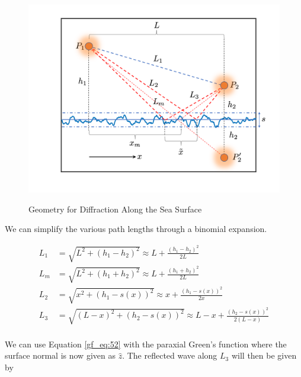 \begin{figure}[ht]
  \begin{center}
\includegraphics[width=5in]{../media/analysis/multipath_layout.png}
  \end{center}
  \renewcommand{\baselinestretch}{1} \small\normalsize
  \begin{quote}
    \caption[Geometry for Diffraction Along the Sea Surface]{Geometry for Diffraction Along the Sea Surface\label{gf_fig:15}}
  \end{quote}
\end{figure}
\renewcommand{\baselinestretch}{2} \small\normalsize

\noindent We can simplify the various path lengths through a binomial expansion. 

\begin{equation}
\begin{aligned}
L_1 & = \sqrt{L^2 + (h_1-h_2)^2}  \approx L + \frac{(h_1 - h_2)^2}{2L}\\
L_m & = \sqrt{L^2 + (h_1+h_2)^2}  \approx L + \frac{(h_1 + h_2)^2}{2L}\\
L_2 &= \sqrt{x^2 + \left( h_1 - s(x)\right)^2}  \approx x + \frac{(h_1-s(x))^2}{2x}\\
L_3 & = \sqrt{\left(L - x\right)^2 + \left( h_2 - s(x)\right)^2}  \approx L-x + \frac{(h_2 - s(x))^2}{2\left(L-x\right)}\\
\end{aligned}
\label{gf_eq:59}
\end{equation}
\renewcommand{\baselinestretch}{2} \small\normalsize

We can use Equation \ref{gf_eq:52} with the paraxial Green's function where the surface normal is now given as $\hat{z}$. The reflected wave along $L_3$ will then be given by

